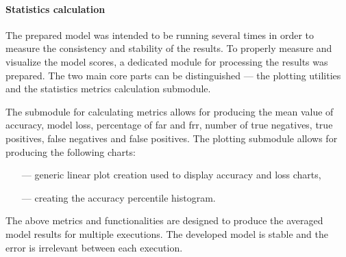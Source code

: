 \paragraph{Statistics calculation}\label{para:statistics-calculation}
The prepared model was intended to be running several times in order to measure the consistency and stability of the results.
To properly measure and visualize the model scores, a dedicated module for processing the results was prepared.
The two main core parts can be distinguished --- the plotting utilities and the statistics metrics calculation submodule.

The submodule for calculating metrics allows for producing the mean value of accuracy, model loss, percentage of \gls{far} and \gls{frr}, number of true negatives, true positives, false negatives and false positives.
The plotting submodule allows for producing the following charts:
\begin{samepage}
    \begin{itemize}
        \item[---] generic linear plot creation used to display accuracy and loss charts,
        \item[---] creating the accuracy percentile histogram.
    \end{itemize}
\end{samepage}

The above metrics and functionalities are designed to produce the averaged model results for multiple executions.
The developed model is stable and the error is irrelevant between each execution.
